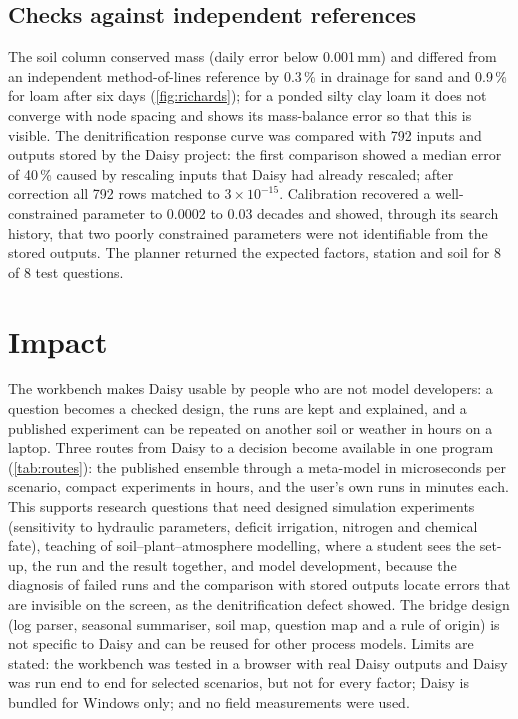 \documentclass[preprint,12pt]{elsarticle}
\begin{document}

\subsection{Checks against independent references}
The soil column conserved mass (daily error below 0.001\,mm) and differed from an independent method-of-lines reference by 0.3\,\% in drainage for sand and 0.9\,\% for loam after six days (\cref{fig:richards}); for a ponded silty clay loam it does not converge with node spacing and shows its mass-balance error so that this is visible. The denitrification response curve was compared with 792 inputs and outputs stored by the Daisy project: the first comparison showed a median error of 40\,\% caused by rescaling inputs that Daisy had already rescaled; after correction all 792 rows matched to $3\times10^{-15}$. Calibration recovered a well-constrained parameter to 0.0002 to 0.03 decades and showed, through its search history, that two poorly constrained parameters were not identifiable from the stored outputs. The planner returned the expected factors, station and soil for 8 of 8 test questions.


\section{Impact}
The workbench makes Daisy usable by people who are not model developers: a question becomes a checked design, the runs are kept and explained, and a published experiment can be repeated on another soil or weather in hours on a laptop. Three routes from Daisy to a decision become available in one program (\cref{tab:routes}): the published ensemble through a meta-model in microseconds per scenario, compact experiments in hours, and the user's own runs in minutes each. This supports research questions that need designed simulation experiments (sensitivity to hydraulic parameters, deficit irrigation, nitrogen and chemical fate), teaching of soil--plant--atmosphere modelling, where a student sees the set-up, the run and the result together, and model development, because the diagnosis of failed runs and the comparison with stored outputs locate errors that are invisible on the screen, as the denitrification defect showed. The bridge design (log parser, seasonal summariser, soil map, question map and a rule of origin) is not specific to Daisy and can be reused for other process models. Limits are stated: the workbench was tested in a browser with real Daisy outputs and Daisy was run end to end for selected scenarios, but not for every factor; Daisy is bundled for Windows only; and no field measurements were used.
\end{document}
